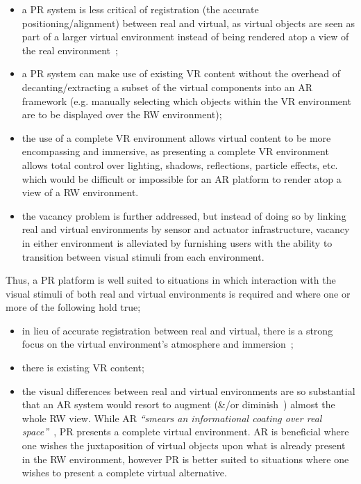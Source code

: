 \begin{itemize}
	\item a PR system is less critical of registration (the accurate positioning/alignment) between real and virtual, as virtual objects are seen as part of a larger virtual environment instead of being rendered atop a view of the real environment~\cite{Azuma1997};
	\item a PR system can make use of existing VR content without the overhead of decanting/extracting a subset of the virtual components into an AR framework (e.g. manually selecting which objects within the VR environment are to be displayed over the RW environment);
	\item the use of a complete VR environment allows virtual content to be more encompassing and immersive, as presenting a complete VR environment allows total control over lighting, shadows, reflections, particle effects, etc. which would be difficult or impossible for an AR platform to render atop a view of a RW environment.
	\item the vacancy problem is further addressed, but instead of doing so by linking real and virtual environments by sensor and actuator infrastructure, vacancy in either environment is alleviated by furnishing users with the ability to transition between visual stimuli from each environment.
\end{itemize}

Thus, a PR platform is well suited to situations in which interaction with the visual stimuli of both real and virtual environments is required and where one or more of the following hold true;

\begin{itemize}
	\item in lieu of accurate registration between real and virtual, there is a strong focus on the virtual environment's atmosphere and immersion~\cite{deamicis:gamebased};
	\item there is existing VR content;
	\item the visual differences between real and virtual environments are so substantial that an AR system would resort to augment (\&/or diminish~\cite{Mann2002}) almost the whole RW view. While AR \textit{``smears an informational coating over real space''}~\cite{Andersen}, PR presents a complete virtual environment. AR is beneficial where one wishes the juxtaposition of virtual objects upon what is already present in the RW environment, however PR is better suited to situations where one wishes to present a complete virtual alternative.
\end{itemize}

